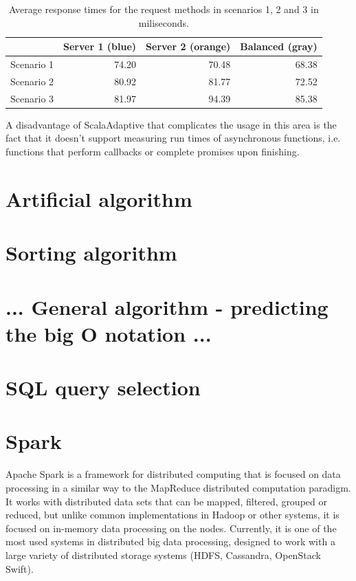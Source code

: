 \begin{table}[h!]
	\centering
	\captionsetup{justification=centering,margin=0.5cm}
		\bgroup
	\def\arraystretch{1.5}%
	
	\begin{tabular}{|l|r|r|r|}
		\hline
		& \textbf{Server 1} (blue)& \textbf{Server 2} (orange)& \textbf{Balanced} (gray)\\ \hline
		Scenario 1 & 74.20             & 70.48             & 68.38             \\ \hline
		Scenario 2 & 80.92             & 81.77             & 72.52             \\ \hline
		Scenario 3 & 81.97             & 94.39             & 85.38             \\ \hline
	\end{tabular}
	\egroup
	\caption{Average response times for the request methods in scenarios 1, 2 and 3 in miliseconds.}
\label{tab:load_balance_resp_avgs}
\end{table}

A disadvantage of ScalaAdaptive that complicates the usage in this area is the fact that it doesn't support measuring run times of asynchronous functions, i.e. functions that perform callbacks or complete promises upon finishing.

\section{Artificial algorithm}
\section{Sorting algorithm}
\section{... General algorithm - predicting the big O notation ...}
\section{SQL query selection}
\section{Spark}

Apache Spark is a framework for distributed computing that is focused on data processing in a similar way to the MapReduce distributed computation paradigm. It works with distributed data sets that can be mapped, filtered, grouped or reduced, but unlike common implementations in Hadoop or other systems, it is focused on in-memory data processing on the nodes. Currently, it is one of the most used systems in distributed big data processing, designed to work with a large variety of distributed storage systems (HDFS, Cassandra, OpenStack Swift).

